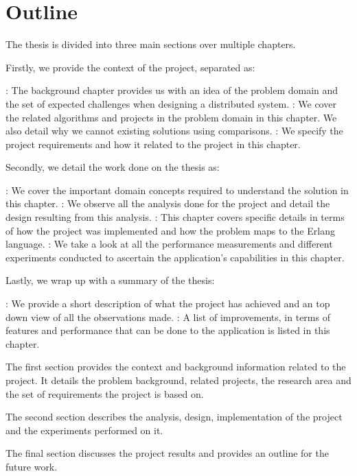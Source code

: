 \section{Outline}
The thesis is divided into three main sections over multiple chapters.

Firstly, we provide the context of the project, separated as:

\begin{itemize}
    : The background chapter provides us with an idea of the
    problem domain and the set of expected challenges when designing a
    distributed system.
    : We cover the related algorithms and projects in the
    problem domain in this chapter. We also detail why we cannot existing
    solutions using comparisons.
    : We specify the project requirements and how it
    related to the project in this chapter.
\end{itemize}

Secondly, we detail the work done on the thesis as:

\begin{itemize}
    : We cover the important domain concepts required to
    understand the solution in this chapter.
    : We observe all the analysis done for the
    project and detail the design resulting from this analysis.
    : This chapter covers specific details in terms of
    how the project was implemented and how the problem maps to the Erlang
    language.
    : We take a look at all the performance
    measurements and different experiments conducted to ascertain the
    application's capabilities in this chapter.
\end{itemize}

Lastly, we wrap up with a summary of the thesis:

\begin{itemize}
    : We provide a short description of what the project has
    achieved and an top down view of all the observations made.
    : A list of improvements, in terms of features and
    performance that can be done to the application is listed in this chapter.
\end{itemize}


The first section provides the context and background information related to the
project. It details the problem background, related projects, the research
area and the set of requirements the project is based on.

The second section describes the analysis, design, implementation of the project
and the experiments performed on it.

The final section discusses the project results and provides an outline for
the future work.

